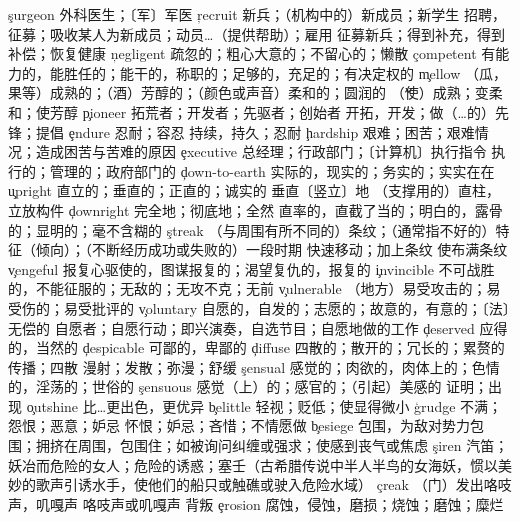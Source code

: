 \begin{multicols}{2}
\c{surgeon}  \n 外科医生；〔军〕军医
\c{recruit}  \n 新兵；（机构中的）新成员；新学生 \vt 招聘，征募；吸收某人为新成员；动员…（提供帮助）；雇用 \vi 征募新兵；得到补充，得到补偿；恢复健康
\c{negligent}  \a 疏忽的；粗心大意的；不留心的；懒散
\c{competent}  \a 有能力的，能胜任的；能干的，称职的；足够的，充足的；有决定权的
\c{mellow}  \a （瓜，果等）成熟的；（酒）芳醇的；（颜色或声音）柔和的；圆润的 \v （使）成熟；变柔和；使芳醇
\c{pioneer}  \n 拓荒者；开发者；先驱者；创始者 \vt 开拓，开发；做（…的）先锋；提倡
\c{endure}  \vt 忍耐；容忍 \vi 持续，持久；忍耐
\c{hardship}  \n 艰难；困苦；艰难情况；造成困苦与苦难的原因
\c{executive}  \n 总经理；行政部门；〔计算机〕执行指令 \a 执行的；管理的；政府部门的
\c{down-to-earth}  \a 实际的，现实的；务实的；实实在在
\c{upright}  \a 直立的；垂直的；正直的；诚实的 \ad 垂直〔竖立〕地 \n （支撑用的）直柱，立放构件
\c{downright}  \ad 完全地；彻底地；全然 \a 直率的，直截了当的；明白的，露骨的；显明的；毫不含糊的
\c{streak}  \n （与周围有所不同的）条纹；（通常指不好的）特征（倾向）；（不断经历成功或失败的）一段时期 \vi 快速移动；加上条纹 \vt 使布满条纹
\c{vengeful}  \a 报复心驱使的，图谋报复的；渴望复仇的，报复的
\c{invincible}  \a 不可战胜的，不能征服的；无敌的；无攻不克；无前
\c{vulnerable}  \a （地方）易受攻击的；易受伤的；易受批评的
\c{voluntary}  \a 自愿的，自发的；志愿的；故意的，有意的；〔法〕无偿的 \n 自愿者；自愿行动；即兴演奏，自选节目；自愿地做的工作
\c{deserved}  \a 应得的，当然的
\c{despicable}  \a 可鄙的，卑鄙的
\c{diffuse}  \a 四散的；散开的；冗长的；累赘的 \vi 传播；四散 \vt 漫射；发散；弥漫；舒缓
\c{sensual}  \a 感觉的；肉欲的，肉体上的；色情的，淫荡的；世俗的
\c{sensuous}  \a 感觉（上）的；感官的；（引起）美感的
 证明；出现
\c{outshine}  \vt 比…更出色，更优异
\c{belittle}  \vt 轻视；贬低；使显得微小
\c{grudge}  \n 不满；怨恨；恶意；妒忌 \vt 怀恨；妒忌；吝惜；不情愿做
\c{besiege}  \vt 包围，为敌对势力包围；拥挤在周围，包围住；如被询问纠缠或强求；使感到丧气或焦虑
\c{siren}  \n 汽笛；妖冶而危险的女人；危险的诱惑；塞壬（古希腊传说中半人半鸟的女海妖，惯以美妙的歌声引诱水手，使他们的船只或触礁或驶入危险水域）
\c{creak}  \vi （门）发出咯吱声，叽嘎声 \n 咯吱声或叽嘎声
 背叛
\c{erosion}  \n 腐蚀，侵蚀，磨损；烧蚀；磨蚀；糜烂

\end{multicols}
